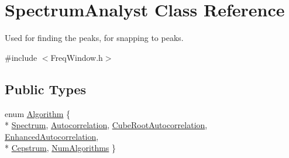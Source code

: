 \hypertarget{class_spectrum_analyst}{}\section{Spectrum\+Analyst Class Reference}
\label{class_spectrum_analyst}


Used for finding the peaks, for snapping to peaks.  




{\ttfamily \#include $<$Freq\+Window.\+h$>$}

\subsection*{Public Types}
\begin{DoxyCompactItemize}
\item 
enum \hyperlink{class_spectrum_analyst_a316d97b25a7683913eec8e08d5645105}{Algorithm} \{ \\*
\hyperlink{class_spectrum_analyst_a316d97b25a7683913eec8e08d5645105a51772a1aa7ef73eecabd7338ca46892d}{Spectrum}, 
\hyperlink{class_spectrum_analyst_a316d97b25a7683913eec8e08d5645105a295f0dfccc72baf679a1b87aeccdd9d6}{Autocorrelation}, 
\hyperlink{class_spectrum_analyst_a316d97b25a7683913eec8e08d5645105aacc2d56fc2ce9c85674f1efca5ad02d0}{Cube\+Root\+Autocorrelation}, 
\hyperlink{class_spectrum_analyst_a316d97b25a7683913eec8e08d5645105a4ab63bb9ec5e9950730ecd01c459a65a}{Enhanced\+Autocorrelation}, 
\\*
\hyperlink{class_spectrum_analyst_a316d97b25a7683913eec8e08d5645105a592983c4a119dd691448f3293f94805e}{Cepstrum}, 
\hyperlink{class_spectrum_analyst_a316d97b25a7683913eec8e08d5645105a8122b34fd28e2c484f999d93dcac3c37}{Num\+Algorithms}
 \}
\end{DoxyCompactItemize}
